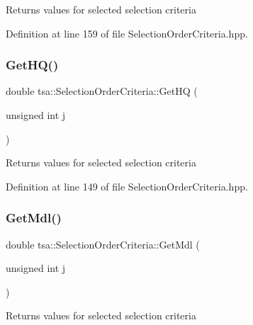 \begin{DoxyReturn}{Returns}
values for selected selection criteria 
\end{DoxyReturn}


Definition at line 159 of file Selection\+Order\+Criteria.\+hpp.

\mbox{\label{classtsa_1_1_selection_order_criteria_a7dd080dd100b191e8b1638d15019c175}} 
\subsubsection{\texorpdfstring{Get\+H\+Q()}{GetHQ()}}
{\footnotesize\ttfamily double tsa\+::\+Selection\+Order\+Criteria\+::\+Get\+HQ (\begin{DoxyParamCaption}\item[{unsigned int}]{j }\end{DoxyParamCaption})\hspace{0.3cm}{\ttfamily [inline]}}

\begin{DoxyReturn}{Returns}
values for selected selection criteria 
\end{DoxyReturn}


Definition at line 149 of file Selection\+Order\+Criteria.\+hpp.

\mbox{\label{classtsa_1_1_selection_order_criteria_a2756d71a6b56eba01538e54fa71f5cce}} 
\subsubsection{\texorpdfstring{Get\+Mdl()}{GetMdl()}}
{\footnotesize\ttfamily double tsa\+::\+Selection\+Order\+Criteria\+::\+Get\+Mdl (\begin{DoxyParamCaption}\item[{unsigned int}]{j }\end{DoxyParamCaption})\hspace{0.3cm}{\ttfamily [inline]}}

\begin{DoxyReturn}{Returns}
values for selected selection criteria 
\end{DoxyReturn}


